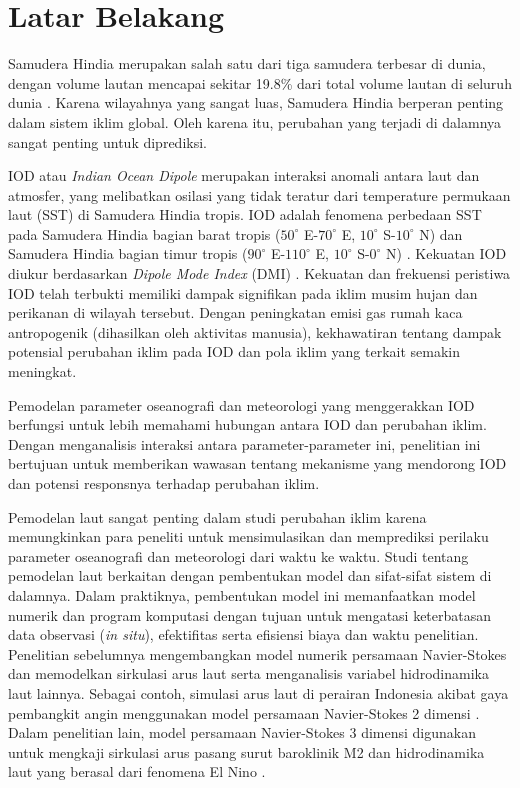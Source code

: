 \vspace{1.5pc}
\section[Latar Belakang]{Latar Belakang}
\begin{spacing}{1.5}
	Samudera Hindia merupakan salah satu dari tiga samudera terbesar di dunia, dengan volume lautan mencapai sekitar 19.8\% dari total volume lautan di seluruh dunia \cite{Eakins2010}. Karena wilayahnya yang sangat luas, Samudera Hindia berperan penting dalam sistem iklim global. Oleh karena itu, perubahan yang terjadi di dalamnya sangat penting untuk diprediksi.
	
	IOD atau \textit{Indian Ocean Dipole} merupakan interaksi anomali antara laut dan atmosfer, yang melibatkan osilasi yang tidak teratur dari temperature permukaan laut (SST) di Samudera Hindia tropis. IOD adalah fenomena perbedaan SST pada Samudera Hindia bagian barat tropis ($50^\circ$ E-$70^\circ$ E, $10^\circ$ S-$10^\circ$ N) dan Samudera Hindia bagian timur tropis ($90^\circ$ E-$110^\circ$ E, $10^\circ$ S-$0^\circ$ N) \cite{Shunmugapandi2022,Thushara2020,Sattar2019}. Kekuatan IOD diukur berdasarkan \textit{Dipole Mode Index} (DMI) \cite{Saji1999}. Kekuatan dan frekuensi peristiwa IOD telah terbukti memiliki dampak signifikan pada iklim musim hujan \cite{Qiu2014} dan perikanan \cite{Lan2013} di wilayah tersebut. Dengan peningkatan emisi gas rumah kaca antropogenik (dihasilkan oleh aktivitas manusia), kekhawatiran tentang dampak potensial perubahan iklim pada IOD dan pola iklim yang terkait semakin meningkat.
	
	Pemodelan parameter oseanografi dan meteorologi yang menggerakkan IOD berfungsi untuk lebih memahami hubungan antara IOD dan perubahan iklim. Dengan menganalisis interaksi antara parameter-parameter ini, penelitian ini bertujuan untuk memberikan wawasan tentang mekanisme yang mendorong IOD dan potensi responsnya terhadap perubahan iklim.
	
	Pemodelan laut sangat penting dalam studi perubahan iklim karena memungkinkan para peneliti untuk mensimulasikan dan memprediksi perilaku parameter oseanografi dan meteorologi dari waktu ke waktu. Studi tentang pemodelan laut berkaitan dengan pembentukan model dan sifat-sifat sistem di dalamnya. Dalam praktiknya, pembentukan model ini memanfaatkan model numerik dan program komputasi dengan tujuan untuk mengatasi keterbatasan data observasi (\textit{in situ}), efektifitas serta efisiensi biaya dan waktu penelitian. Penelitian sebelumnya mengembangkan model numerik persamaan Navier-Stokes dan memodelkan sirkulasi arus laut serta menganalisis variabel hidrodinamika laut lainnya. Sebagai contoh, simulasi arus laut di perairan Indonesia akibat gaya pembangkit angin menggunakan model persamaan Navier-Stokes 2 dimensi \cite{Rizal2018,Ikhwan2019,Haditiar2019}. Dalam penelitian lain, model persamaan Navier-Stokes 3 dimensi digunakan untuk mengkaji sirkulasi arus pasang surut baroklinik M2 dan hidrodinamika laut yang berasal dari fenomena El Nino \cite{Rizal2010,Haditiar2020,Ikhwan2021}.
	

\end{spacing}
